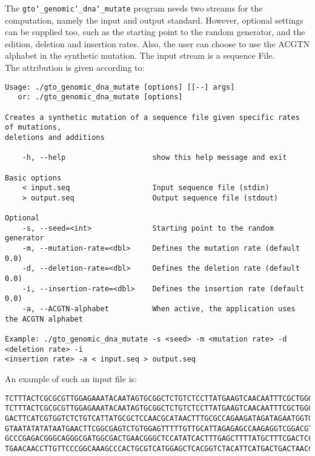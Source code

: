 The \texttt{gto\char`_genomic\char`_dna\char`_mutate} program needs two streams for the computation, namely the input and output standard. However, optional settings can be supplied too, such as the starting point to the random generator, and the edition, deletion and insertion rates. Also, the user can choose to use the ACGTN alphabet in the synthetic mutation. The input stream is a sequence File.\\
The attribution is given according to:
\begin{lstlisting}
Usage: ./gto_genomic_dna_mutate [options] [[--] args]
   or: ./gto_genomic_dna_mutate [options]

Creates a synthetic mutation of a sequence file given specific rates of mutations, 
deletions and additions

    -h, --help                    show this help message and exit

Basic options
    < input.seq                   Input sequence file (stdin)
    > output.seq                  Output sequence file (stdout)

Optional
    -s, --seed=<int>              Starting point to the random generator
    -m, --mutation-rate=<dbl>     Defines the mutation rate (default 0.0)
    -d, --deletion-rate=<dbl>     Defines the deletion rate (default 0.0)
    -i, --insertion-rate=<dbl>    Defines the insertion rate (default 0.0)
    -a, --ACGTN-alphabet          When active, the application uses the ACGTN alphabet

Example: ./gto_genomic_dna_mutate -s <seed> -m <mutation rate> -d <deletion rate> -i 
<insertion rate> -a < input.seq > output.seq
\end{lstlisting}
An example of such an input file is:
\begin{lstlisting}
TCTTTACTCGCGCGTTGGAGAAATACAATAGTGCGGCTCTGTCTCCTTATGAAGTCAACAATTTCGCTGGGACTTGCGGC
TCTTTACTCGCGCGTTGGAGAAATACAATAGTGCGGCTCTGTCTCCTTATGAAGTCAACAATTTCGCTGGGACTTGCGGC
GACTTCATCGTGGTCTCTGTCATTATGCGCTCCAACGCATAACTTTGCGCCAGAAGATAGATAGAATGGTGTAAGAAACT
GTAATATATATAATGAACTTCGGCGAGTCTGTGGAGTTTTTGTTGCATTAGAGAGCCAAGAGGTCGGACGTCCTCACGTA
GCCCGAGACGGGCAGGGCGATGGCGACTGAACGGGCTCCATATCACTTTGAGCTTTTATGCTTTCGACTCCTCCAGGAGC
TGAACAACCTTGTTCCCGGCAAAGCCCACTGCGTCATGGAGCTCACGGTCTACATTCATGACTGACTAACCGTAAACTGC
\end{lstlisting}

